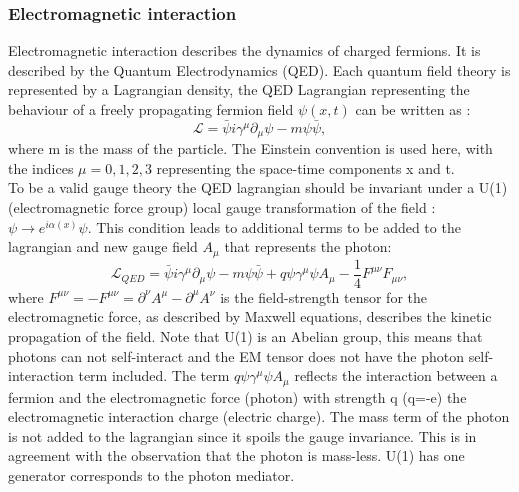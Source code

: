 \subsubsection{Electromagnetic interaction}
Electromagnetic interaction describes the dynamics of charged fermions. It is described by the Quantum Electrodynamics (QED). Each quantum field theory is represented by a Lagrangian density, the QED Lagrangian representing the behaviour of a freely propagating fermion field $\psi (x,t)$ can be written as : 
\begin{equation}
    \mathcal{L} = \bar{\psi}i\gamma^\mu\partial_\mu\psi - m\psi\bar{\psi},
\end{equation}
where m is the mass of the particle. The Einstein convention is used here, with the indices $\mu= 0,1,2,3$ representing the space-time components x and t. \\ 
To be a valid gauge theory the QED lagrangian should be invariant under a U(1) (electromagnetic force group) local gauge transformation of the field : $\psi\rightarrow e^{i\alpha(x)}\psi$. This condition leads to additional terms to be added to the lagrangian and new gauge field $A_{\mu}$ that represents the photon:
\begin{equation}
    \mathcal{L}_{QED} = \bar{\psi}i\gamma^\mu\partial_\mu\psi - m\psi\bar{\psi} + q\psi\gamma^{\mu}\psi A_{\mu} - \frac{1}{4}F^{\mu\nu}F_{\mu\nu},
\end{equation}
where $F^{\mu\nu} = - F^{\mu\nu} = \partial^{\nu}A^{\mu} - \partial^{\mu}A^{\nu}$ is the field-strength tensor for the electromagnetic force, as described by Maxwell equations, describes the kinetic propagation of the field. Note that U(1) is an Abelian group, this means that photons can not self-interact and the EM tensor does not have the photon self-interaction term included. The term $q\psi\gamma^{\mu}\psi A_{\mu}$ reflects the interaction between a fermion and the electromagnetic force (photon) with strength q (q=-e) the electromagnetic interaction charge (electric charge). The mass term of the photon is not added to the lagrangian since it spoils the gauge invariance. This is in agreement with the observation that the photon is mass-less. U(1) has one generator corresponds to the photon mediator.
